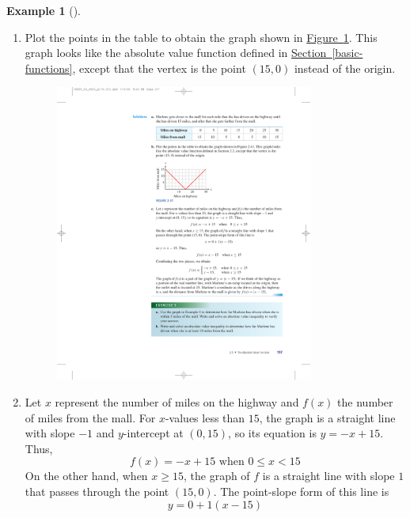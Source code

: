 \documentclass[10pt,]{book}
\theoremstyle{plain}
\theoremstyle{definition}
\theoremstyle{definition}
\theoremstyle{definition}
\newtheorem{example}[theorem]{Example}
\theoremstyle{definition}
\theoremstyle{definition}
\numberwithin{equation}{section}
\newcommand{\lt}{ < }
\begin{document}
\begin{example}[]
\begin{enumerate}[label=*\alph**]
\begin{table}
\begin{tabular}{AcAcAcAcAcAcAcAcA}
\end{tabular}
\end{table}
\item\hypertarget{li-365}{}
        Plot the points in the table to obtain the graph shown in \hyperref[fig-abs-highway-distance]{Figure~\ref{fig-abs-highway-distance}}. This graph looks like the absolute value function defined in \hyperref[basic-functions]{Section~\ref{basic-functions}}, except that the vertex is the point \((15, 0)\) instead of the origin.
        \leavevmode%
\begin{figure}
\centering
\includegraphics[width=0.80\textwidth,]{images/fig-abs-highway-distance.pdf}\caption{\label{fig-abs-highway-distance}}
\end{figure}
\item\hypertarget{li-366}{}
        Let \(x\) represent the number of miles on the highway and \(f (x)\) the number of miles from the mall. For \(x\)-values less than \(15\), the graph is a straight line with slope \(−1\) and \(y\)-intercept at \((0, 15)\), so its equation is \(y = −x + 15\). Thus,
        \begin{equation*}f (x) = −x + 15 \text{ when } 0 \le x \lt 15\end{equation*}
        On the other hand, when \(x \ge 15\), the graph of \(f\) is a straight line with slope \(1\) that passes through the point \((15, 0)\). The point-slope form of this line is
        \begin{equation*}y = 0 + 1(x − 15)\end{equation*}

\end{enumerate}
\end{example}
\end{document}
